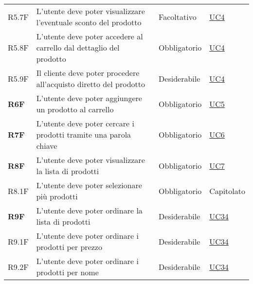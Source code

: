 \begin{center}
\begin{longtable}[!h]{p{50px} p{245px} p{75px} p{50px}}
        R5.7F                                 & L'utente deve poter visualizzare l'eventuale sconto del prodotto                                    & Facoltativo              & \hyperref[sec:UC4]{UC4}                        \\
        R5.8F                                 & L'utente deve poter accedere al carrello dal dettaglio del prodotto                                 & Obbligatorio             & \hyperref[sec:UC4]{UC4}                        \\
        R5.9F                                 & Il cliente deve poter procedere all'acquisto diretto del prodotto                                   & Desiderabile             & \hyperref[sec:UC4]{UC4}                        \\
        \textbf{R6F}                          & L'utente deve poter aggiungere un prodotto al carrello                                              & Obbligatorio             & \hyperref[sec:UC5]{UC5}                        \\
        \textbf{R7F}                          & L'utente deve poter cercare i prodotti tramite una parola chiave                                    & Obbligatorio             & \hyperref[sec:UC6]{UC6}                        \\
        \textbf{R8F}                          & L'utente deve poter visualizzare la lista di prodotti                                               & Obbligatorio             & \hyperref[sec:UC7]{UC7}                        \\
        R8.1F                                 & L'utente deve poter selezionare più prodotti                                                        & Obbligatorio             & Capitolato                                     \\
        \textbf{R9F}                          & L'utente deve poter ordinare la lista di prodotti                                                   & Desiderabile             & \hyperref[sec:UC34]{UC34}                      \\
        R9.1F                                 & L'utente deve poter ordinare i prodotti per prezzo                                                  & Desiderabile             & \hyperref[sec:UC34]{UC34}                      \\
        R9.2F                                 & L'utente deve poter ordinare i prodotti per nome                                                    & Desiderabile             & \hyperref[sec:UC34]{UC34}                      \\

\end{longtable}
\end{center}
